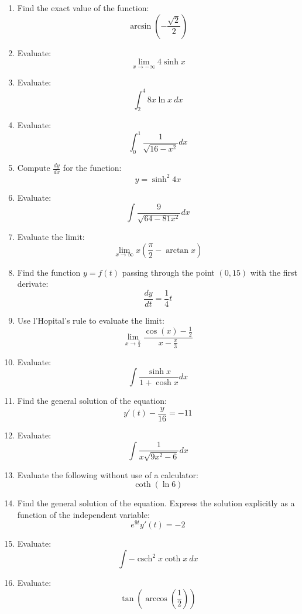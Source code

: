 \documentclass[fleqn]{article}
\DeclareMathOperator{\csch}{csch}
\begin{document}
\begin{multicols}{2}
\begin{enumerate}

\item Find the exact value of the function:
\[\arcsin\left(-\frac{\sqrt{2}}{2}\right)\]

\item Evaluate:
\[\lim_{x\to-\infty}4\sinh x\]

\item Evaluate:
\[\int_2^4 8x\ln x\ dx\]

\item Evaluate:
\[\int_0^1\frac{1}{\sqrt{16-x^2}}dx\]

\item Compute \(\frac{dy}{dx}\) for the function:
\[y=\sinh^2 4x\]

\item Evaluate:
\[\int\frac{9}{\sqrt{64-81x^2}}dx\]

\item Evaluate the limit:
\[\lim_{x\to\infty}x\left(\frac{\pi}{2}-\arctan x\right)\]

\item Find the function \(y=f(t)\) passing through the point \((0,15)\) with the first derivate:
\[\frac{dy}{dt}=\frac{1}{4}t\]

\item Use l'Hopital's rule to evaluate the limit:
\[\lim_{x\to\frac{\pi}{3}}\frac{\cos(x)-\frac{1}{2}}{x-\frac{x}{3}}\]

\item Evaluate:
\[\int\frac{\sinh x}{1+\cosh x}dx\]

\item Find the general solution of the equation:
\[y'(t)-\frac{y}{16}=-11\]

\item Evaluate:
\[\int\frac{1}{x\sqrt{9x^2-6}}dx\]

\item Evaluate the following without use of a calculator:
\[\coth(\ln 6)\]

\item Find the general solution of the equation. Express the solution explicitly as a function of the independent variable:
\[e^{9t}y'(t)=-2\]

\item Evaluate:
\[\int-\csch^2 x\coth x\ dx\]

\item Evaluate:
\[\tan\left(\arccos\left(\frac{1}{2}\right)\right)\]


\end{enumerate}
\end{multicols}
\end{document}
